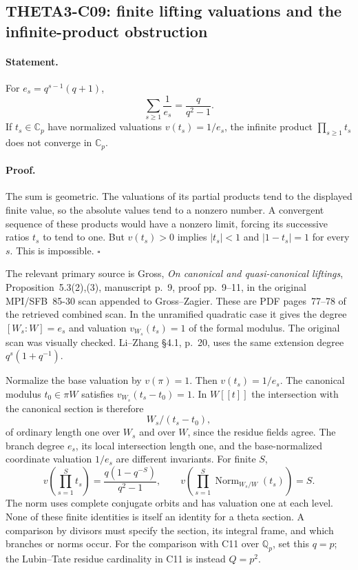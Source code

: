 \documentclass[11pt]{article}
\newcommand{\Q}{\mathbb Q}\newcommand{\C}{\mathbb C}\newcommand{\Z}{\mathbb Z}\newcommand{\R}{\mathbb R}\newcommand{\A}{\mathbb A}\newcommand{\OO}{\mathcal O}
\theoremstyle{definition}\newtheorem{definition}[theorem]{Definition}\newtheorem{remark}[theorem]{Remark}
\begin{document}
\subsection{THETA3-C09: finite lifting valuations and the infinite-product obstruction}\label{C09}

\paragraph{Statement.}
For $e_s=q^{s-1}(q+1)$,
\[
 \sum_{s\geq1}\frac1{e_s}=\frac{q}{q^2-1}.
\]
If $t_s\in\C_p$ have normalized valuations $v(t_s)=1/e_s$, the
infinite product $\prod_{s\geq1}t_s$ does not converge in $\C_p$.

\paragraph{Proof.}
The sum is geometric. The valuations of its partial products tend
to the displayed finite value, so the absolute values tend to a
nonzero number. A convergent sequence of these products would have
a nonzero limit, forcing its successive ratios $t_s$ to tend to
one. But $v(t_s)>0$ implies $|t_s|<1$ and $|1-t_s|=1$ for every
$s$. This is impossible. $\square$

The relevant primary source is Gross, \emph{On canonical and
quasi-canonical liftings}, Proposition~5.3(2),(3), manuscript p.~9,
proof pp.~9--11, in the original MPI/SFB~85-30 scan appended to
Gross--Zagier. These are PDF pages~77--78 of the retrieved combined
scan. In the unramified quadratic case it gives the degree
$[W_s:W]=e_s$ and valuation $v_{W_s}(t_s)=1$ of the formal modulus.
The original scan was visually checked. Li--Zhang \S4.1, p.~20,
uses the same extension degree $q^s(1+q^{-1})$.

Normalize the base valuation by $v(\pi)=1$. Then
$v(t_s)=1/e_s$. The canonical modulus $t_0\in\pi W$ satisfies
$v_{W_s}(t_s-t_0)=1$. In $W[[t]]$ the intersection with the canonical
section is therefore
\[
 W_s/(t_s-t_0),
\]
of ordinary length one over $W_s$ and over $W$, since the residue
fields agree. The branch degree $e_s$, its local intersection
length one, and the base-normalized coordinate valuation $1/e_s$
are different invariants. For finite $S$,
\[
 v\left(\prod_{s=1}^St_s\right)
 =\frac{q(1-q^{-S})}{q^2-1},\qquad
 v\left(\prod_{s=1}^S
             \operatorname{Norm}_{W_s/W}(t_s)\right)=S.
\]
The norm uses complete conjugate orbits and has valuation one at
each level. None of these finite identities is itself an identity
for a theta section. A comparison by divisors must specify the
section, its integral frame, and which branches or norms occur.
For the comparison with C11 over $\Q_p$, set this $q=p$; the
Lubin--Tate residue cardinality in C11 is instead $Q=p^2$.
\end{document}
